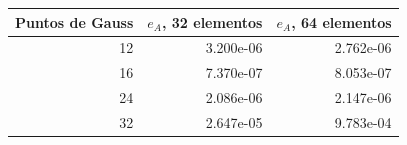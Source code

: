 \begin{tabular}{rrr}
\toprule
Puntos de Gauss & $e_A$, 32 elementos & $e_A$, 64 elementos\\
\midrule
12 & 3.200e-06 & 2.762e-06\\
16 & 7.370e-07 & 8.053e-07\\
24 & 2.086e-06 & 2.147e-06\\
32 & 2.647e-05 & 9.783e-04\\
\bottomrule
\end{tabular}

